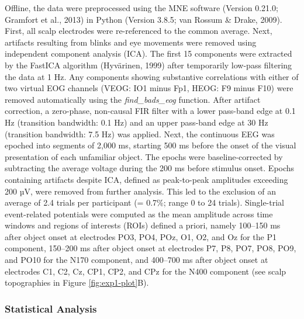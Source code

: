 \documentclass[
  english,
  man,12pt,twoside]{apa7}
\begin{document}
Offline, the data were preprocessed using the MNE software (Version 0.21.0; Gramfort et al., 2013) in Python (Version 3.8.5; van Rossum \& Drake, 2009). First, all scalp electrodes were re-referenced to the common average. Next, artifacts resulting from blinks and eye movements were removed using independent component analysis (ICA). The first 15 components were extracted by the FastICA algorithm (Hyvärinen, 1999) after temporarily low-pass filtering the data at 1 Hz. Any components showing substantive correlations with either of two virtual EOG channels (VEOG: IO1 minus Fp1, HEOG: F9 minus F10) were removed automatically using the \emph{find\_bads\_eog} function. After artifact correction, a zero-phase, non-causal FIR filter with a lower pass-band edge at 0.1 Hz (transition bandwidth: 0.1 Hz) and an upper pass-band edge at 30 Hz (transition bandwidth: 7.5 Hz) was applied. Next, the continuous EEG was epoched into segments of 2,000 ms, starting 500 ms before the onset of the visual presentation of each unfamiliar object. The epochs were baseline-corrected by subtracting the average voltage during the 200 ms before stimulus onset. Epochs containing artifacts despite ICA, defined as peak-to-peak amplitudes exceeding 200 µV, were removed from further analysis. This led to the exclusion of an average of 2.4 trials per participant (= 0.7\%; range 0 to 24 trials). Single-trial event-related potentials were computed as the mean amplitude across time windows and regions of interests (ROIs) defined a priori, namely 100--150 ms after object onset at electrodes PO3, PO4, POz, O1, O2, and Oz for the P1 component, 150--200 ms after object onset at electrodes P7, P8, PO7, PO8, PO9, and PO10 for the N170 component, and 400--700 ms after object onset at electrodes C1, C2, Cz, CP1, CP2, and CPz for the N400 component (see scalp topographies in Figure \ref{fig:exp1-plot}B).

\hypertarget{statistical-analysis}{%
\subsubsection{Statistical Analysis}\label{statistical-analysis}}
\end{document}
